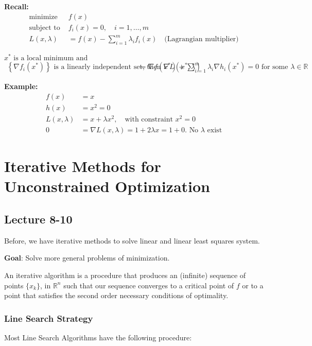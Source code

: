 \begin{problem}
  \textbf{Recall:}
\begin{align*}
\text{minimize } & f(x) \\
\text{subject to } & f_i(x) = 0, \quad i = 1, \dots, m \\
L(x, \lambda) &= f(x) - \sum_{i=1}^m \lambda_i f_i(x) \quad \text{(Lagrangian multiplier)}
\end{align*}

 $x^* \text{ is a local minimum and }$
\begin{align*}
\left\{ \nabla f_i(x^*) \right\} \text{ is a linearly independent set, then }
\nabla L(x^*, \lambda) &= \nabla f(x^*) + \sum_{i=1}^m \lambda_i \nabla h_i(x^*) = 0 \text{ for some } \lambda \in \mathbb{R}
\end{align*}

\textbf{Example:}
\begin{align*}
f(x) &= x \\
h(x) &= x^2 = 0 \\
L(x, \lambda) &= x + \lambda x^2, \quad \text{with constraint } x^2 = 0 \\
0 &= \nabla L(x, \lambda) = 1 + 2 \lambda x=1+0. \text{ No $\lambda$ exist}
\end{align*}

\end{problem}
\section{Iterative Methods for Unconstrained Optimization}
\subsection{Lecture 8-10}
Before, we have iterative methods to solve linear and linear least squares system.

\textbf{Goal}: Solve more general problems of minimization.

An iterative algorithm is a procedure that produces an (infinite) sequence of points $\{x_k\}$, in $\mathbb R^n$ such that our sequence converges to a critical point of $f$ or to a point that satisfies the second order necessary conditions of optimality.

\subsubsection{Line Search Strategy}
Most Line Search Algorithms have the following procedure:

